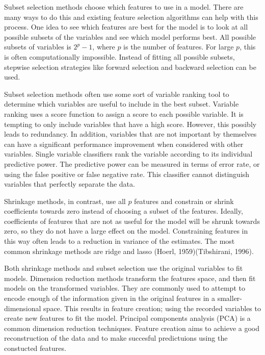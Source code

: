 \documentclass[12pt,twoside]{reedthesis}
\theoremstyle{definition}
\theoremstyle{definition}
\theoremstyle{definition}
\theoremstyle{remark}
\begin{document}
Subset selection methods choose which features to use in a model. There
are many ways to do this and existing feature selection algorithms can
help with this process. One idea to see which features are best for the
model is to look at all possible subsets of the variables and see which
model performs best. All possible subsets of variables is \(2^p-1\),
where \(p\) is the number of features. For large \(p\), this is often
computationally impossible. Instead of fitting all possible subsets,
stepwise selection strategies like forward selection and backward
selection can be used.

Subset selection methods often use some sort of variable ranking tool to
determine which variables are useful to include in the best subset.
Variable ranking uses a score function to assign a score to each
possible variable. It is tempting to only include variables that have a
high score. However, this possibly leads to redundancy. In addition,
variables that are not important by themselves can have a significant
performance improvement when considered with other variables. Single
variable classifiers rank the variable according to its individual
predictive power. The predictive power can be measured in terms of error
rate, or using the false positive or false negative rate. This
classifier cannot distinguish variables that perfectly separate the
data.

Shrinkage methods, in contrast, use all \(p\) features and constrain or
shrink coefficients towards zero instead of choosing a subset of the
features. Ideally, coefficients of features that are not as useful for
the model will be shrunk towards zero, so they do not have a large
effect on the model. Constraining features in this way often leads to a
reduction in variance of the estimates. The most common shrinkage
methods are ridge and lasso (Hoerl, 1959)(Tibshirani, 1996).

Both shrinkage methods and subset selection use the original variables
to fit models. Dimension reduction methods transform the features space,
and then fit models on the transformed variables. They are commonly used
to attempt to encode enough of the information given in the original
features in a smaller-dimensional space. This results in feature
creation; using the recorded variables to create new features to fit the
model. Principal components analysis (PCA) is a common dimension
reduction techniques. Feature creation aims to achieve a good
reconstruction of the data and to make succesful predictuions using the
constucted features.
\end{document}

